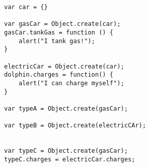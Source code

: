 \begin{verbatim}
var car = {}

var gasCar = Object.create(car);
gasCar.tankGas = function () {
	alert("I tank gas!");
}

electricCar = Object.create(car);
dolphin.charges = function() {
	alert("I can charge myself");
}

var typeA = Object.create(gasCar);

var typeB = Object.create(electricCAr);


var typeC = Object.create(gasCar);
typeC.charges = electricCar.charges;
\end{verbatim}

